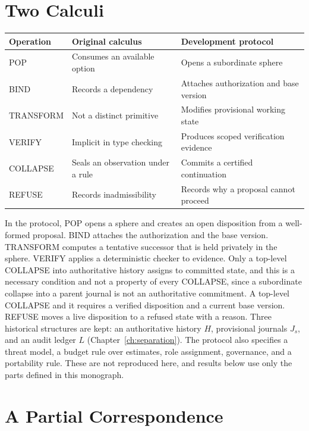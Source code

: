 \documentclass[12pt,oneside,openany]{book}
\theoremstyle{spherepop}
\theoremstyle{remarkstyle}
\begin{document}
\section{Two Calculi}

\begin{center}
\small
\begin{tabular}{p{}p{}p{}}
\toprule
Operation & Original calculus & Development protocol \\
\midrule
POP & Consumes an available option & Opens a subordinate sphere \\
BIND & Records a dependency & Attaches authorization and base version \\
TRANSFORM & Not a distinct primitive & Modifies provisional working state \\
VERIFY & Implicit in type checking & Produces scoped verification evidence \\
COLLAPSE & Seals an observation under a rule & Commits a certified continuation \\
REFUSE & Records inadmissibility & Records why a proposal cannot proceed \\
\bottomrule
\end{tabular}
\end{center}

In the protocol, POP opens a sphere and creates an open disposition from a well-formed proposal. BIND attaches the authorization and the base version. TRANSFORM computes a tentative successor that is held privately in the sphere. VERIFY applies a deterministic checker to evidence. Only a top-level COLLAPSE into authoritative history assigns to committed state, and this is a necessary condition and not a property of every COLLAPSE, since a subordinate collapse into a parent journal is not an authoritative commitment. A top-level COLLAPSE and it requires a verified disposition and a current base version. REFUSE moves a live disposition to a refused state with a reason. Three historical structures are kept: an authoritative history $H$, provisional journals $J_s$, and an audit ledger $L$ (Chapter~\ref{ch:separation}). The protocol also specifies a threat model, a budget rule over estimates, role assignment, governance, and a portability rule. These are not reproduced here, and results below use only the parts defined in this monograph.

\section{A Partial Correspondence}
\label{sec:correspondence}
\end{document}
